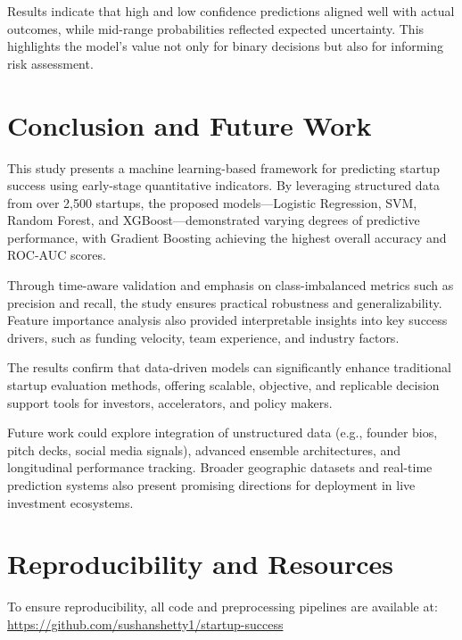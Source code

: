 \documentclass[conference]{IEEEtran}
\begin{document}
Results indicate that high and low confidence predictions aligned well with actual outcomes, while mid-range probabilities reflected expected uncertainty. This highlights the model’s value not only for binary decisions but also for informing risk assessment.


\section{Conclusion and Future Work}



This study presents a machine learning-based framework for predicting startup success using early-stage quantitative indicators. By leveraging structured data from over 2,500 startups, the proposed models—Logistic Regression, SVM, Random Forest, and XGBoost—demonstrated varying degrees of predictive performance, with Gradient Boosting achieving the highest overall accuracy and ROC-AUC scores.

Through time-aware validation and emphasis on class-imbalanced metrics such as precision and recall, the study ensures practical robustness and generalizability. Feature importance analysis also provided interpretable insights into key success drivers, such as funding velocity, team experience, and industry factors.

The results confirm that data-driven models can significantly enhance traditional startup evaluation methods, offering scalable, objective, and replicable decision support tools for investors, accelerators, and policy makers. 

Future work could explore integration of unstructured data (e.g., founder bios, pitch decks, social media signals), advanced ensemble architectures, and longitudinal performance tracking. Broader geographic datasets and real-time prediction systems also present promising directions for deployment in live investment ecosystems.


\section*{Reproducibility and Resources}
To ensure reproducibility, all code and preprocessing pipelines are available at:\\
\url{https://github.com/sushanshetty1/startup-success}



\end{document}
